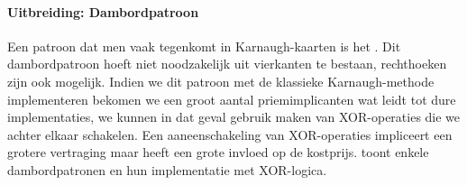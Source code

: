 \paragraph{Uitbreiding: Dambordpatroon}
Een patroon dat men vaak tegenkomt in Karnaugh-kaarten is het . Dit dambordpatroon hoeft niet noodzakelijk uit vierkanten te bestaan, rechthoeken zijn ook mogelijk. Indien we dit patroon met de klassieke Karnaugh-methode implementeren bekomen we een groot aantal priemimplicanten wat leidt tot dure implementaties, we kunnen in dat geval gebruik maken van XOR-operaties die we achter elkaar schakelen. Een aaneenschakeling van XOR-operaties impliceert een grotere vertraging maar heeft een grote invloed op de kostprijs.  toont enkele dambordpatronen en hun implementatie met XOR-logica.


